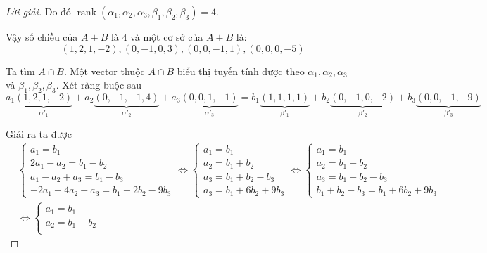 \begin{proof}[Lời giải]
    Do đó $\operatorname{rank}(\alpha_{1},\alpha_{2},\alpha_{3},\beta_{1},\beta_{2},\beta_{3}) = 4$.
    
    Vậy số chiều của $A + B$ là $4$ và một cơ sở của $A + B$ là:
    \[ (1, 2, 1, -2), (0, -1, 0, 3), (0, 0, -1, 1), (0, 0, 0, -5) \]
    
    Ta tìm $A\cap B$. Một vector thuộc $A\cap B$ biểu thị tuyến tính được theo $\alpha_{1}, \alpha_{2}, \alpha_{3}$ và $\beta_{1}, \beta_{2}, \beta_{3}$. Xét ràng buộc sau
    \[ a_{1}\underbrace{(1,2,1,-2)}_{\alpha'_{1}} + a_{2}\underbrace{(0,-1,-1,4)}_{\alpha'_{2}} + a_{3}\underbrace{(0,0,1,-1)}_{\alpha'_{3}} = b_{1}\underbrace{(1,1,1,1)}_{\beta'_{1}} + b_{2}\underbrace{(0,-1,0,-2)}_{\beta'_{2}} + b_{3}\underbrace{(0,0,-1,-9)}_{\beta'_{3}} \]
    
    Giải ra ta được
    \begin{align*}
         & \begin{cases}
               a_{1} = b_{1}                         \\
               2a_{1} - a_{2} = b_{1} - b_{2}        \\
               a_{1} - a_{2} + a_{3} = b_{1} - b_{3} \\
               -2a_{1} + 4a_{2} - a_{3} = b_{1} - 2b_{2} - 9b_{3}
           \end{cases}
        \Longleftrightarrow
        \begin{cases}
            a_{1} = b_{1}                 \\
            a_{2} = b_{1} + b_{2}         \\
            a_{3} = b_{1} + b_{2} - b_{3} \\
            a_{3} = b_{1} + 6b_{2} + 9b_{3}
        \end{cases}
        \Longleftrightarrow
        \begin{cases}
            a_{1} = b_{1}                 \\
            a_{2} = b_{1} + b_{2}         \\
            a_{3} = b_{1} + b_{2} - b_{3} \\
            b_{1} + b_{2} - b_{3} = b_{1} + 6b_{2} + 9b_{3}
        \end{cases}       \\
         & \Longleftrightarrow\begin{cases}
                                  a_{1} = b_{1}                 \\
                                  a_{2} = b_{1} + b_{2}         \\

\end{cases}
\end{align*}
\end{proof}
